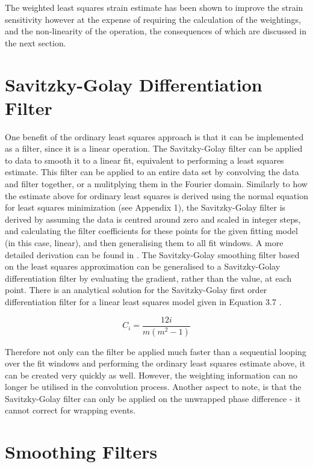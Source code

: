 The weighted least squares strain estimate has been shown to improve the strain sensitivity \cite{kennedy_strain_2012} however at the expense of requiring the calculation of the weightings, and the non-linearity of the operation, the consequences of which are discussed in the next section.

\section{Savitzky-Golay Differentiation Filter}
One benefit of the ordinary least squares approach is that it can be implemented as a filter, since it is a linear operation. The Savitzky-Golay filter \cite{savitzky_smoothing_1964} can be applied to data to smooth it to a linear fit, equivalent to performing a least squares estimate. This filter can be applied to an entire data set by convolving the data and filter together, or a mulitplying them in the Fourier domain. Similarly to how the estimate above for ordinary least squares is derived using the normal equation for least squares minimization (see Appendix 1), the Savitzky-Golay filter is derived by assuming the data is centred around zero and scaled in integer steps, and calculating the filter coefficients for these points for the given fitting model (in this case, linear), and then generalising them to all fit windows. A more detailed derivation can be found in \cite{savitzky_smoothing_1964}. The Savitzky-Golay smoothing filter based on the least squares approximation can be generalised to a Savitzky-Golay differentiation filter by evaluating the gradient, rather than the value, at each point. There is an analytical solution for the Savitzky-Golay first order differentiation filter for a linear least squares model given in Equation 3.7 \cite{madden_comments_1978}.

\begin{equation}
	C_i = \frac{12 i}{m(m^2-1)}
\end{equation}

Therefore not only can the filter be applied much faster than a sequential looping over the fit windows and performing the ordinary least squares estimate above, it can be created very quickly as well. However, the weighting information can no longer be utilised in the convolution process. Another aspect to note, is that the Savitzky-Golay filter can only be applied on the unwrapped phase difference - it cannot correct for wrapping events. 

\section{Smoothing Filters}


